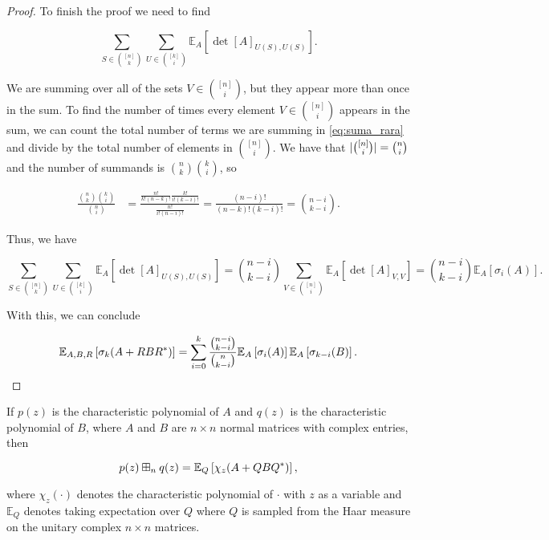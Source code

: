 \begin{proof}
    To finish the proof we need to find

    \begin{equation} \label{eq:suma_rara} \sum_{S\in\binom{[n]}{k}} \sum_{U\in \binom{[k]}{i}}  \mathbb E_A\left[\det[A]_{U(S),U(S)} \right]. \end{equation}

    We are summing over all of the sets $V \in \binom{[n]}{i}$, but they appear more than once in the sum. To find the number of times every element $V\in \binom{[n]}{i}$ appears in the sum, we can count the total number of terms we are summing in \eqref{eq:suma_rara} and divide by the total number of elements in $\binom{[n]}{i}$. We have that $\lvert \binom{[n]}i \rvert = \binom{n}{i}$ and the number of summands is $\binom{n}{k}\binom{k}{i}$, so

    \begin{align*}
        \frac{\binom{n}{k}\binom{k}{i}}{\binom{n}{i}} &= \frac{\frac{n!}{k!(n-k)!}\frac{k!}{i!(k-i)!}}{\frac{n!}{i!(n-i)!}} = \frac{(n-i)!}{(n-k)!(k-i)!} = \binom{n-i}{k-i}.
    \end{align*}

    Thus, we have

    \begin{equation*}
        \sum_{S\in\binom{[n]}{k}} \sum_{U\in \binom{[k]}{i}}  \mathbb E_A\left[ \det[A]_{U(S),U(S)} \right] = \binom{n-i}{k-i} \sum_{V\in \binom{[n]}{i}} \mathbb E_A\left[ \det[A]_{V,V} \right] = \binom{n-i}{k-i}\mathbb E_A\left[\sigma_{i}(A)\right].
    \end{equation*}

    With this, we can conclude

    \begin{equation*}
        \mathbb E_{A,B,R}\left[ \sigma_k(A + RBR^*) \right] =  \sum_{i=0}^k \frac{\binom{n-i}{k-i}}{\binom{n}{k-i}}\mathbb E_{A} \left[\sigma_i(A)\right] \mathbb E_{A}\left[\sigma_{k-i}(B)\right].
    \end{equation*}

\end{proof}


\begin{theorem} \label{thm:symmad}
    If $p(z)$ is the characteristic polynomial of $A$ and $q(z)$ is the characteristic polynomial of $B$, where $A$ and $B$ are $n\times n$ normal matrices with complex entries, then 

    \begin{equation*}
        p(z) \boxplus_n q(z) = \mathbb E_Q\left[\chi_z(A + Q B Q^*)\right],
    \end{equation*}

    \noindent where $\chi_z(\cdot)$ denotes the characteristic polynomial of $\cdot$ with $z$ as a variable and $\mathbb E_Q$ denotes taking expectation over $Q$ where $Q$ is sampled from the Haar measure on the unitary complex $n\times n$ matrices.
\end{theorem}

